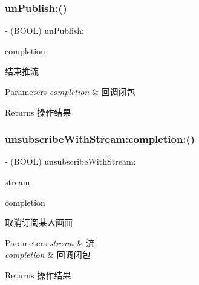 \subsubsection{\texorpdfstring{un\+Publish\+:()}{unPublish:()}}
{\footnotesize\ttfamily -\/ (B\+O\+OL) un\+Publish\+: \begin{DoxyParamCaption}\item[{(C\+C\+Comletion\+Block)}]{completion }\end{DoxyParamCaption}}

结束推流 
\begin{DoxyParams}{Parameters}
{\em completion} & 回调闭包 \\
\hline
\end{DoxyParams}
\begin{DoxyReturn}{Returns}
操作结果 
\end{DoxyReturn}
\mbox{\label{interface_c_c_streamer_basic_a84d647ce0824c172ae3a9ee95676ccb6}} 
\subsubsection{\texorpdfstring{unsubscribe\+With\+Stream\+:completion\+:()}{unsubscribeWithStream:completion:()}}
{\footnotesize\ttfamily -\/ (B\+O\+OL) unsubscribe\+With\+Stream\+: \begin{DoxyParamCaption}\item[{(\hyperlink{interface_c_c_stream}{C\+C\+Stream} $\ast$)}]{stream }\item[{completion:(C\+C\+Comletion\+Block)}]{completion }\end{DoxyParamCaption}}

取消订阅某人画面 
\begin{DoxyParams}{Parameters}
{\em stream} & 流 \\
\hline
{\em completion} & 回调闭包 \\
\hline
\end{DoxyParams}
\begin{DoxyReturn}{Returns}
操作结果 
\end{DoxyReturn}
\mbox{\label{interface_c_c_streamer_basic_a55bf0d02dbd791b32f53a0ea55680f04}} 
